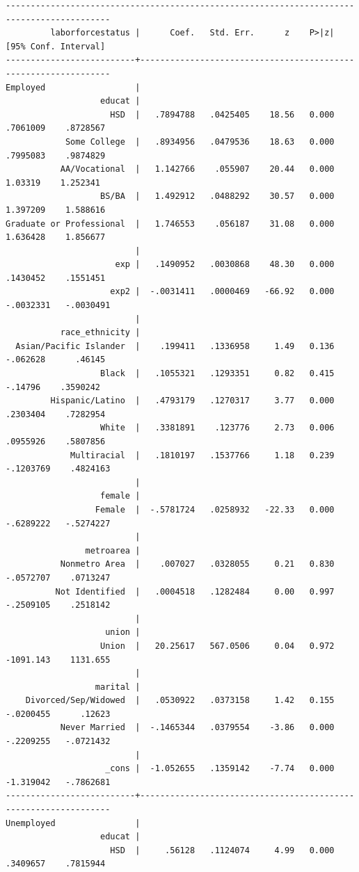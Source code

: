 \documentclass[
]{book}
\begin{document}
\begin{verbatim}
-------------------------------------------------------------------------------------------
         laborforcestatus |      Coef.   Std. Err.      z    P>|z|     [95% Conf. Interval]
--------------------------+----------------------------------------------------------------
Employed                  |
                   educat |
                     HSD  |   .7894788   .0425405    18.56   0.000     .7061009    .8728567
            Some College  |   .8934956   .0479536    18.63   0.000     .7995083    .9874829
           AA/Vocational  |   1.142766    .055907    20.44   0.000      1.03319    1.252341
                   BS/BA  |   1.492912   .0488292    30.57   0.000     1.397209    1.588616
Graduate or Professional  |   1.746553    .056187    31.08   0.000     1.636428    1.856677
                          |
                      exp |   .1490952   .0030868    48.30   0.000     .1430452    .1551451
                     exp2 |  -.0031411   .0000469   -66.92   0.000    -.0032331   -.0030491
                          |
           race_ethnicity |
  Asian/Pacific Islander  |    .199411   .1336958     1.49   0.136     -.062628      .46145
                   Black  |   .1055321   .1293351     0.82   0.415      -.14796    .3590242
         Hispanic/Latino  |   .4793179   .1270317     3.77   0.000     .2303404    .7282954
                   White  |   .3381891    .123776     2.73   0.006     .0955926    .5807856
             Multiracial  |   .1810197   .1537766     1.18   0.239    -.1203769    .4824163
                          |
                   female |
                  Female  |  -.5781724   .0258932   -22.33   0.000    -.6289222   -.5274227
                          |
                metroarea |
           Nonmetro Area  |    .007027   .0328055     0.21   0.830    -.0572707    .0713247
          Not Identified  |   .0004518   .1282484     0.00   0.997    -.2509105    .2518142
                          |
                    union |
                   Union  |   20.25617   567.0506     0.04   0.972    -1091.143    1131.655
                          |
                  marital |
    Divorced/Sep/Widowed  |   .0530922   .0373158     1.42   0.155    -.0200455      .12623
           Never Married  |  -.1465344   .0379554    -3.86   0.000    -.2209255   -.0721432
                          |
                    _cons |  -1.052655   .1359142    -7.74   0.000    -1.319042   -.7862681
--------------------------+----------------------------------------------------------------
Unemployed                |
                   educat |
                     HSD  |     .56128   .1124074     4.99   0.000     .3409657    .7815944

\end{verbatim}
\end{document}

